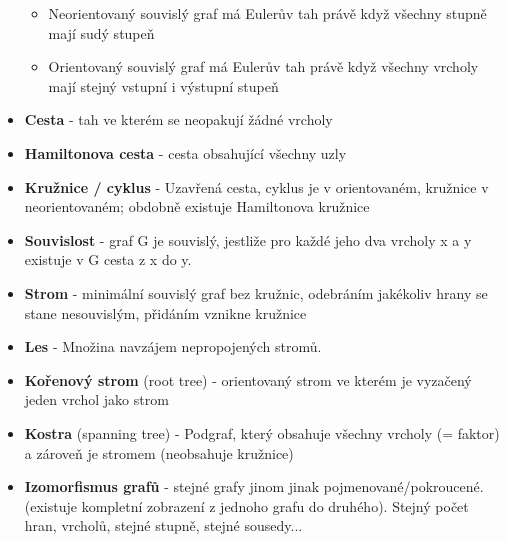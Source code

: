 \documentclass[10pt,a4paper]{article}
\begin{document}
\begin{itemize}
\begin{itemize}
\item Neorientovaný souvislý graf má Eulerův tah právě když všechny stupně mají sudý stupeň
\item Orientovaný souvislý graf má Eulerův tah právě když všechny vrcholy mají stejný vstupní i výstupní stupeň
\end{itemize}
\item \textbf{Cesta} - tah ve kterém se neopakují žádné vrcholy
\item \textbf{Hamiltonova cesta} - cesta obsahující všechny uzly
\item \textbf{Kružnice / cyklus} - Uzavřená cesta, cyklus je v orientovaném, kružnice v neorientovaném; obdobně existuje Hamiltonova kružnice
\item \textbf{Souvislost} - graf G je souvislý, jestliže pro každé jeho dva vrcholy x a y existuje v G cesta z x do y.
\item \textbf{Strom} - minimální souvislý graf bez kružnic, odebráním jakékoliv hrany se stane nesouvislým, přidáním vznikne kružnice
\item \textbf{Les} - Množina navzájem nepropojených stromů.
\item \textbf{Kořenový strom} (root tree) - orientovaný strom ve kterém je vyzačený jeden vrchol jako strom
\item \textbf{Kostra} (spanning tree) - Podgraf, který obsahuje všechny vrcholy (= faktor) a zároveň je stromem (neobsahuje kružnice)
\item \textbf{Izomorfismus grafů} - stejné grafy jinom jinak pojmenované/pokroucené.(existuje kompletní zobrazení z jednoho grafu do druhého). Stejný počet hran, vrcholů, stejné stupně, stejné sousedy...
\end{itemize}
\end{document}

